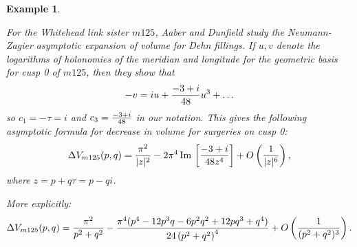 \documentclass[reqno]{amsproc}  %
\newtheorem{ex}[prop]{\bf Example}
\begin{document}
\begin{ex}\label{m125_NZ4}
{\em
For the Whitehead link sister $m125$, Aaber and Dunfield \cite{AD}
study the Neumann-Zagier asymptotic expansion of volume for Dehn fillings.
If  $u,v$ denote the  logarithms of holonomies of the 
 meridian and longitude for the geometric
 basis for cusp 0 of $m125$, 
 then they show \cite[p1019]{AD} that
\begin{equation}  \label{eq29}
-v = i u + { -3 + i \over 48} u^3 +  \ldots
\end{equation} 
 so 
$c_1 = -\tau = i$ and $c_3 = {-3 + i \over 48}$ in our notation.
This gives the following asymptotic formula for decrease in volume
for surgeries on cusp 0:
\begin{equation}  \label{eq30}
\Delta V_{m125} (p,q)=  
{ \pi^2 \over |z|^2} -
{2 \pi^4}\,\text{Im}\, \left[  {-3 + i \over 48 z^4}\right] + O \left({1 \over |z|^6}\right),
\end{equation} 
where  $z =  p + q \tau = p - q i$.

More explicitly: 
\begin{equation}  \label{eq31}
\Delta V_{m125} (p,q)=  
{ \pi^2 \over p^2+q^2} -
\frac{\pi^4(p^4-12 p^3 q-6 p^2 q^2+12 p q^3+q^4)}{ 24\left(p^2+q^2\right)^4}
+ O \left({1 \over (p^2+q^2)^3}\right).
\end{equation} 
}
\end{ex}
\end{document}
